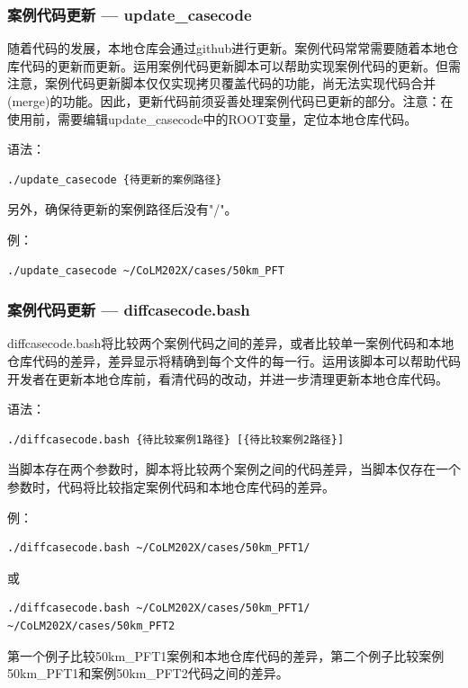 \subsubsection{案例代码更新 --- update\_casecode}

随着代码的发展，本地仓库会通过github进行更新。案例代码常常需要随着本地仓库代码的更新而更新。运用案例代码更新脚本可以帮助实现案例代码的更新。但需注意，案例代码更新脚本仅仅实现拷贝覆盖代码的功能，尚无法实现代码合并(merge)的功能。因此，更新代码前须妥善处理案例代码已更新的部分。注意：在使用前，需要编辑update\_casecode中的ROOT变量，定位本地仓库代码。

语法：
\begin{lstlisting}[xleftmargin=2.5em]
./update_casecode {待更新的案例路径}
\end{lstlisting}
另外，确保待更新的案例路径后没有"/"。

例：
\begin{lstlisting}[xleftmargin=2.5em]
./update_casecode ~/CoLM202X/cases/50km_PFT
\end{lstlisting}

\subsubsection{案例代码更新 --- diffcasecode.bash}

diffcasecode.bash将比较两个案例代码之间的差异，或者比较单一案例代码和本地仓库代码的差异，差异显示将精确到每个文件的每一行。运用该脚本可以帮助代码开发者在更新本地仓库前，看清代码的改动，并进一步清理更新本地仓库代码。

语法：

\begin{lstlisting}[xleftmargin=2.5em]
./diffcasecode.bash {待比较案例1路径} [{待比较案例2路径}]
\end{lstlisting}

当脚本存在两个参数时，脚本将比较两个案例之间的代码差异，当脚本仅存在一个参数时，代码将比较指定案例代码和本地仓库代码的差异。

例：
\begin{lstlisting}[xleftmargin=2.5em]
./diffcasecode.bash ~/CoLM202X/cases/50km_PFT1/
\end{lstlisting}
或
\begin{lstlisting}[xleftmargin=2.5em]
./diffcasecode.bash ~/CoLM202X/cases/50km_PFT1/ ~/CoLM202X/cases/50km_PFT2
\end{lstlisting}

第一个例子比较50km\_PFT1案例和本地仓库代码的差异，第二个例子比较案例50km\_PFT1和案例50km\_PFT2代码之间的差异。



